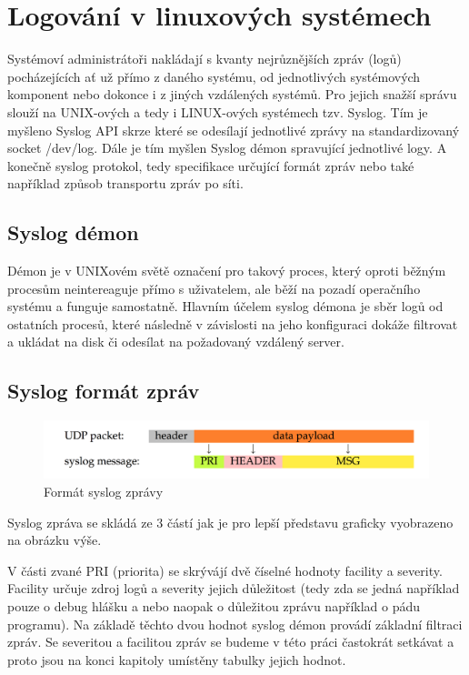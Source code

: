\documentclass[thesis=B,czech]{FITthesis}[2012/06/26]
\begin{document}
\chapter{Logování v linuxových systémech}
Systémoví administrátoři nakládají s kvanty nejrůznějších zpráv (logů) pocházejících ať už přímo z daného systému, od jednotlivých systémových komponent nebo dokonce i z jiných vzdálených systémů. Pro jejich snažší správu slouží na UNIX-ových a tedy i LINUX-ových systémech tzv. Syslog. Tím je myšleno Syslog API skrze které se odesílají jednotlivé zprávy na standardizovaný socket /dev/log. Dále je tím myšlen Syslog démon spravující jednotlivé logy. A konečně syslog protokol, tedy specifikace určující formát zpráv nebo také například způsob transportu zpráv po síti.

\section{Syslog démon}
Démon je v UNIXovém světě označení pro takový proces, který oproti běžným procesům neintereaguje přímo s uživatelem, ale běží na pozadí operačního systému a funguje samostatně. Hlavním účelem syslog démona je sběr logů od ostatních procesů, které následně v závislosti na jeho konfiguraci dokáže filtrovat a ukládat na disk či odesílat na požadovaný vzdálený server.

\section{Syslog formát zpráv}
\begin{figure}[H]
	\centering
	\includegraphics[scale=0.3]{images/syslog-message-format}
	\caption[Formát syslog zprávy]{Formát syslog zprávy}
\end{figure}

Syslog zpráva se skládá ze 3 částí jak je pro lepší představu graficky vyobrazeno na obrázku výše.

V části zvané PRI (priorita) se skrývájí dvě číselné hodnoty facility a severity. Facility určuje zdroj logů a severity jejich důležitost (tedy zda se jedná například pouze o debug hlášku a nebo naopak o důležitou zprávu například o pádu programu). Na základě těchto dvou hodnot syslog démon provádí základní filtraci zpráv.  
Se severitou a facilitou zpráv se budeme v této práci častokrát setkávat a proto jsou na konci kapitoly umístěny tabulky jejich hodnot.
\end{document}
